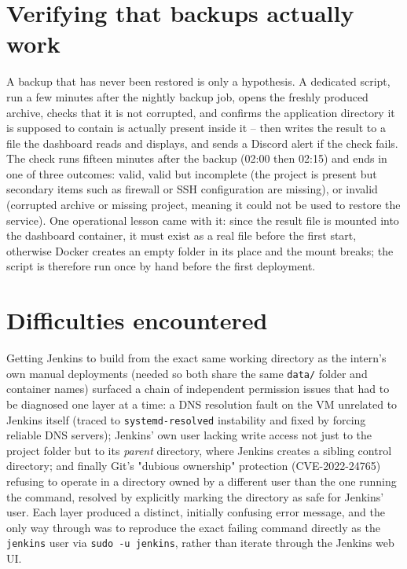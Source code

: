 \section{Verifying that backups actually work}
A backup that has never been restored is only a hypothesis. A dedicated script, run a few minutes after the nightly backup job, opens the freshly produced archive, checks that it is not corrupted, and confirms the application directory it is supposed to contain is actually present inside it -- then writes the result to a file the dashboard reads and displays, and sends a Discord alert if the check fails. The check runs fifteen minutes after the backup (02:00 then 02:15) and ends in one of three outcomes: valid, valid but incomplete (the project is present but secondary items such as firewall or SSH configuration are missing), or invalid (corrupted archive or missing project, meaning it could not be used to restore the service). One operational lesson came with it: since the result file is mounted into the dashboard container, it must exist as a real file before the first start, otherwise Docker creates an empty folder in its place and the mount breaks; the script is therefore run once by hand before the first deployment.

\section{Difficulties encountered}
Getting Jenkins to build from the exact same working directory as the intern's own manual deployments (needed so both share the same \texttt{data/} folder and container names) surfaced a chain of independent permission issues that had to be diagnosed one layer at a time: a DNS resolution fault on the VM unrelated to Jenkins itself (traced to \texttt{systemd-resolved} instability and fixed by forcing reliable DNS servers); Jenkins' own user lacking write access not just to the project folder but to its \emph{parent} directory, where Jenkins creates a sibling control directory; and finally Git's "dubious ownership" protection (CVE-2022-24765) refusing to operate in a directory owned by a different user than the one running the command, resolved by explicitly marking the directory as safe for Jenkins' user. Each layer produced a distinct, initially confusing error message, and the only way through was to reproduce the exact failing command directly as the \texttt{jenkins} user via \texttt{sudo -u jenkins}, rather than iterate through the Jenkins web UI.

\clearpage
